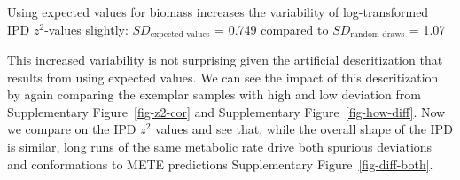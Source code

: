 \documentclass[
  letterpaper,
  DIV=11,
  numbers=noendperiod]{scrartcl}
\newenvironment{Shaded}{\begin{snugshade}}{\end{snugshade}}
\newcommand{\AttributeTok}[1]{\textcolor[rgb]{0.40,0.45,0.13}{#1}}
\newcommand{\ConstantTok}[1]{\textcolor[rgb]{0.56,0.35,0.01}{#1}}
\newcommand{\FloatTok}[1]{\textcolor[rgb]{0.68,0.00,0.00}{#1}}
\newcommand{\FunctionTok}[1]{\textcolor[rgb]{0.28,0.35,0.67}{#1}}
\newcommand{\NormalTok}[1]{\textcolor[rgb]{0.00,0.23,0.31}{#1}}
\newcommand{\SpecialCharTok}[1]{\textcolor[rgb]{0.37,0.37,0.37}{#1}}
\newcommand{\StringTok}[1]{\textcolor[rgb]{0.13,0.47,0.30}{#1}}
\begin{document}
Using expected values for biomass increases the variability of
log-transformed IPD \(z^2\)-values slightly:
\(SD_\text{expected values}\) = 0.749 compared to
\(SD_\text{random draws}\) = 1.07

This increased variability is not surprising given the artificial
descritization that results from using expected values. We can see the
impact of this descritization by again comparing the exemplar samples
with high and low deviation from Supplementary Figure~\ref{fig-z2-cor}
and Supplementary Figure~\ref{fig-how-diff}. Now we compare on the IPD
\(z^2\) values and see that, while the overall shape of the IPD is
similar, long runs of the same metabolic rate drive both spurious
deviations and conformations to METE predictions Supplementary
Figure~\ref{fig-diff-both}.

\begin{Shaded}
\end{Shaded}
\end{document}
